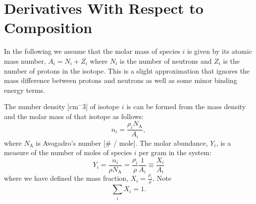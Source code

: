 \section{Derivatives With Respect to Composition}
\label{Sec:Derivatives With Respect to Composition}
In the following we assume that the molar mass of species $i$ is given by its
atomic mass number, $A_i = N_i + Z_i$ where $N_i$ is the number of neutrons
and $Z_i$ is the number of protons in the isotope.    This 
is a slight approximation that ignores the mass difference between protons 
and neutrons as well as some minor binding energy terms.

The number density [cm$^-{3}$] of isotope $i$ is can be formed from the mass 
density and the molar mass of that isotope as follows:
\begin{equation}\label{eq:number density}
  n_i = \frac{\rho_i N_\text{A}}{A_i},
\end{equation}
where $N_\text{A}$ is Avogadro's number [\# / mole].  The molar abundance, 
$Y_i$, is a measure of the number of moles of species $i$ per gram in the 
system:
\begin{equation}\label{eq:molar abundance}
  Y_i = \frac{n_i}{\rho N_\text{A}} = \frac{\rho_i}{\rho}\frac{1}{A_i} 
  \equiv \frac{X_i}{A_i}
\end{equation}
where we have defined the mass fraction, $X_i = \frac{\rho_i}{\rho}$.  Note
\begin{equation}\label{eq:mass fraction sums to 1}
  \sum_i X_i = 1.
\end{equation}

